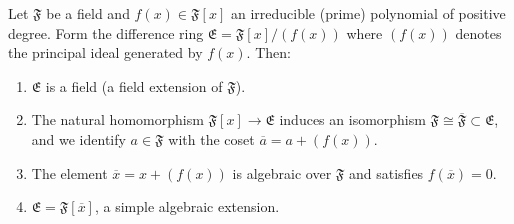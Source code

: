 Let $\mathfrak{F}$ be a field and $f(x) \in \mathfrak{F}[x]$ an irreducible (prime) polynomial of positive degree. Form the difference ring $\mathfrak{E} = \mathfrak{F}[x]/(f(x))$ where $(f(x))$ denotes the principal ideal generated by $f(x)$. Then:
\begin{enumerate}
\item $\mathfrak{E}$ is a field (a field extension of $\mathfrak{F}$).
\item The natural homomorphism $\mathfrak{F}[x] \to \mathfrak{E}$ induces an isomorphism $\mathfrak{F} \cong \overline{\mathfrak{F}} \subset \mathfrak{E}$, and we identify $a \in \mathfrak{F}$ with the coset $\overline{a} = a + (f(x))$.
\item The element $\overline{x} = x + (f(x))$ is algebraic over $\mathfrak{F}$ and satisfies $f(\overline{x}) = 0$.
\item $\mathfrak{E} = \mathfrak{F}[\overline{x}]$, a simple algebraic extension.
\end{enumerate}
